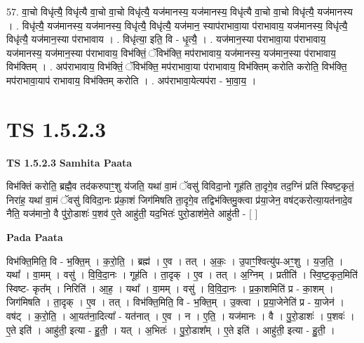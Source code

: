 \documentclass[17pt]{extarticle}
\begin{document}
57. वा॒चो विधृ॑त्यै॒ विधृ॑त्यै वा॒चो वा॒चो विधृ॑त्यै॒ यज॑मानस्य॒ यज॑मानस्य॒ विधृ॑त्यै वा॒चो वा॒चो विधृ॑त्यै॒ यज॑मानस्य । . विधृ॑त्यै॒ यज॑मानस्य॒ यज॑मानस्य॒ विधृ॑त्यै॒ विधृ॑त्यै॒ यज॑मान॒ स्याप॑राभावा॒या प॑राभावाय॒ यज॑मानस्य॒ विधृ॑त्यै॒ विधृ॑त्यै॒ यज॑मान॒स्या प॑राभावाय । . विधृ॑त्या॒ इति॒ वि - धृ॒त्यै॒ । . यज॑मान॒स्या प॑राभावा॒या प॑राभावाय॒ यज॑मानस्य॒ यज॑मान॒स्या प॑राभावाय॒ विभ॑क्तिं॒ ॅविभ॑क्ति॒ मप॑राभावाय॒ यज॑मानस्य॒ यज॑मान॒स्या प॑राभावाय॒ विभ॑क्तिम् । . अप॑राभावाय॒ विभ॑क्तिं॒ ॅविभ॑क्ति॒ मप॑राभावा॒या प॑राभावाय॒ विभ॑क्तिम् करोति करोति॒ विभ॑क्ति॒ मप॑राभावा॒याप॑ राभावाय॒ विभ॑क्तिम् करोति । . अप॑राभावा॒येत्यप॑रा - भा॒वा॒य॒ । \newline
\pagebreak
{}

\section{ TS 1.5.2.3 }

\textbf{TS 1.5.2.3 } \newline
\textbf{Samhita Paata} \newline

विभ॑क्तिं करोति॒ ब्रह्मै॒व तद॑करुपाꣳ॒॒शु य॑जति॒ यथा॑ वा॒मं ॅवसु॑ विविदा॒नो गूह॑ति ता॒दृगे॒व तद॒ग्निं प्रति॑ स्विष्ट॒कृतं॒ निरा॑ह॒ यथा॑ वा॒मं ॅवसु॑ विविदा॒नः प्र॑का॒शं जिग॑मिषति ता॒दृगे॒व तद्विभ॑क्तिमु॒क्त्वा प्र॑या॒जेन॒ वष॑ट्करोत्या॒यत॑नादे॒व नैति॒ यज॑मानो॒ वै पु॑रो॒डाशः॑ प॒शव॑ ए॒ते आहु॑ती॒ यद॒भितः॑ पुरो॒डाश॑मे॒ते आहु॑ती - [ ] \newline

\textbf{Pada Paata} \newline

विभ॑क्ति॒मिति॒ वि - भ॒क्ति॒म् । क॒रो॒ति॒ । ब्रह्म॑ । ए॒व । तत् । अ॒कः॒ । उ॒पाꣳ॒॒श्वित्यु॑प-अꣳ॒॒शु । य॒ज॒ति॒ । यथा᳚ । वा॒मम् । वसु॑ । वि॒वि॒दा॒नः । गूह॑ति । ता॒दृक् । ए॒व । तत् । अ॒ग्निम् । प्रतीति॑ । स्वि॒ष्ट॒कृत॒मिति॑ स्विष्ट- कृत᳚म् । निरिति॑ । आ॒ह॒ । यथा᳚ । वा॒मम् । वसु॑ । वि॒वि॒दा॒नः । प्र॒का॒शमिति॑ प्र - का॒शम् । जिग॑मिषति । ता॒दृक् । ए॒व । तत् । विभ॑क्ति॒मिति॒ वि - भ॒क्ति॒म् । उ॒क्त्वा । प्र॒या॒जेनेति॑ प्र - या॒जेन॑ । वष॑ट् । क॒रो॒ति॒ । आ॒यत॑ना॒दित्या᳚ - यत॑नात् । ए॒व । न । ए॒ति॒ । यज॑मानः । वै । पु॒रो॒डाशः॑ । प॒शवः॑ । ए॒ते इति॑ । आहु॑ती॒ इत्या - हु॒ती॒ । यत् । अ॒भितः॑ । पु॒रो॒डाश᳚म् । ए॒ते इति॑ । आहु॑ती॒ इत्या - हु॒ती॒ ।  \newline
\end{document}

